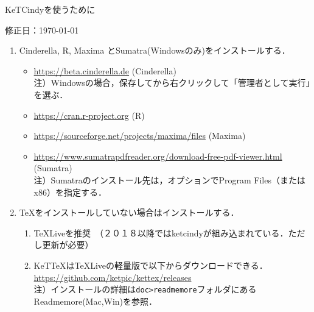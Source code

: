 \documentclass{ujarticle}
\begin{document}
\begin{center}
KeTCindyを使うために
\end{center}

\vspace{-5mm}

\hfill 修正日：\today

\begin{enumerate}[\bf\large 1.]
\item Cinderella, R, Maxima とSumatra(Windowsのみ)をインストールする．\vspace{-2mm}

 \begin{itemize}
 \item \url{https://beta.cinderella.de}  (Cinderella)\\
\hspace*{6mm}注）Windowsの場合，保存してから右クリックして「管理者として実行」を選ぶ．
 \item \url{https://cran.r-project.org}   (R)
 \item \url{https://sourceforge.net/projects/maxima/files}  (Maxima)
 \item \url{https://www.sumatrapdfreader.org/download-free-pdf-viewer.html} (Sumatra)\\
\hspace*{6mm}注）Sumatraのインストール先は，オプションでProgram Files（またはx86）を指定する．

 \end{itemize}
\item TeXをインストールしていない場合はインストールする．\vspace{-2mm}
 \begin{enumerate}[(1)]
 \item TeXLiveを推奨　（２０１８以降ではketcindyが組み込まれている．ただし更新が必要）
 \item KeTTeXはTeXLiveの軽量版で以下からダウンロードできる．\\
\hspace*{3mm}\url{https://github.com/ketpic/kettex/releases}\\
    \hspace*{6mm}注）インストールの詳細は\verb|doc>readmemore|フォルダにあるReadmemore(Mac,Win)を参照．
\end{enumerate}
 

\end{enumerate}
\end{document}
